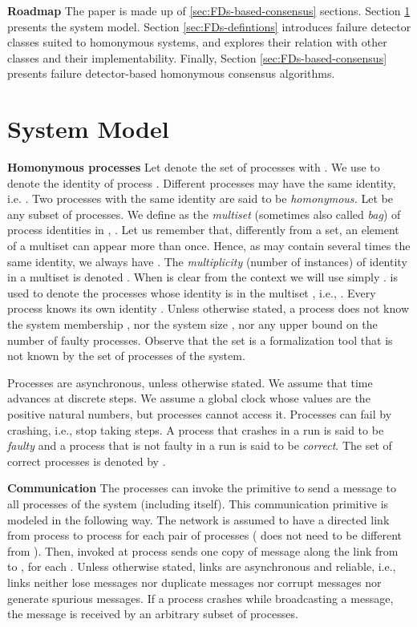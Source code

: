 \documentclass[10pt, conference, compsocconf]{IEEEtran}
\newcommand{\tightparagraph}[1]{\smallskip \noindent \textbf{#1} \hspace{1ex}}
\begin{document}
\tightparagraph{Roadmap}
The   paper  is   made   up  of   \ref{sec:FDs-based-consensus}  sections.   
Section \ref{sec:model} presents the system model. Section 
\ref{sec:FDs-defintions} introduces failure  detector classes suited 
to homonymous
systems, and explores their relation with other classes and their 
implementability.
Finally, Section \ref{sec:FDs-based-consensus} presents  failure 
detector-based homonymous consensus algorithms.




\section{System Model}
\label{sec:model} 

\tightparagraph{Homonymous processes} 
Let  denote the set of processes with  .
 We use   to denote the identity  of process  .  
Different processes may  have the
same  identity,  i.e. .  Two
processes with the same identity are said to be \emph{homonymous.}   
Let  be any subset of processes. We  define  as the
\emph{multiset} (sometimes also called {\it bag}) of process identities  
in ,  . Let us remember that, differently
from a set, an element of a multiset can appear more than once. 
Hence, as   may contain several  times the same   identity, 
we always have .  
The  \emph{multiplicity}   (number  of   instances)  of
identity       in    a    multiset    is  denoted   
. When  is clear from the context we will use simply
.      is used to denote
the  processes whose  identity is in the multiset , i.e., 
. 
Every  process    knows  its   own identity
. Unless  otherwise stated, a process   does not  know the system
membership , nor the system size , nor any upper bound  on the 
number of faulty processes. Observe that the set  is
a formalization tool that is not known by the set of processes of the system. 


Processes are  asynchronous, unless otherwise  stated. We assume  that time
advances at discrete  steps. We assume a global clock  whose values are the
positive natural numbers, but processes cannot access it. 
Processes can  fail by  crashing, i.e.,   stop taking steps. 
A process that  crashes in a run is said to  be \emph{faulty} and a
process that is not  faulty in a run is said to  be \emph{correct}. 
The set of correct processes is denoted by . 


\tightparagraph{Communication}
The processes can invoke the primitive  to send a message
 to all  processes of the system (including  itself). This communication
primitive is modeled in the following way. The network is assumed to have a
directed link  from process  to  process  for each  pair of processes
  ( does  not  need  to  be  different from  ).  Then,
 invoked at  process  sends one copy  of message  along
the link  from  to , for  each .  Unless otherwise stated,
links are asynchronous and reliable,  i.e., links neither lose messages nor
duplicate messages nor corrupt  messages nor generate spurious messages. If
a process crashes while broadcasting a message, the message is received
by an arbitrary  subset of processes.  
\end{document}
